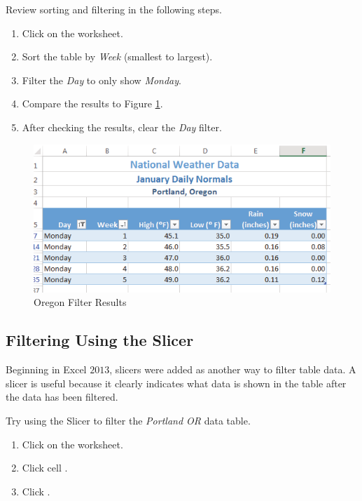Review sorting and filtering in the following steps.

\begin{enumbox}
	\begin{enumerate}
		\item Click on the  worksheet.
		\item Sort the table by \textit{Week} (smallest to largest).
		\item Filter the \textit{Day} to only show \textit{Monday}.
		\item Compare the results to Figure \ref{05:fig19}.
		\item After checking the results, clear the \textit{Day} filter.
	\end{enumerate}
\end{enumbox}
	
\begin{figure}[H]
	\centering
	\includegraphics[width=\maxwidth{.95\linewidth}]{gfx/ch05_fig19}
	\caption{Oregon Filter Results}
	\label{05:fig19}
\end{figure}

\subsection{Filtering Using the Slicer}

Beginning in Excel $ 2013 $, slicers were added as another way to filter table data. A slicer is useful because it clearly indicates what data is shown in the table after the data has been filtered.

Try using the Slicer to filter the \textit{Portland OR} data table.

\begin{enumbox}
	\begin{enumerate}
		\item Click on the  worksheet. 
		\item Click cell .
		\item Click .
	\end{enumerate}
\end{enumbox}
		
